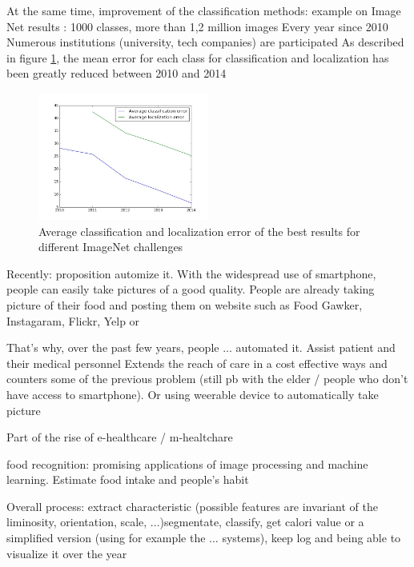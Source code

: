 At the same time, improvement of the classification methods: example on Image Net results \cite{Russakovsky2015}:
1000 classes, more than 1,2 million images
Every year since 2010
Numerous institutions (university, tech companies) are participated
As described in figure \ref{fig:imagenet_results}, the mean error for each class for classification and localization has been greatly reduced between 2010 and 2014

\begin{figure}[h]
    \centering
    \includegraphics[width=0.5\textwidth,  height=0.455\textwidth ]{img/imagenet}
    \caption{Average classification and localization error of the best results for different ImageNet challenges}
    \label{fig:imagenet_results}
\end{figure}

Recently: proposition automize it. With the widespread use of smartphone, people can easily take pictures of a good quality. People are already taking picture of their food and posting them on website such as Food Gawker, Instagaram, Flickr, Yelp or 

That's why, over the past few years, people ... automated it. Assist patient and their medical personnel
Extends the reach of care in a cost effective ways and counters some of the previous problem (still pb with the elder / people who don't have access to smartphone). Or using weerable device to automatically take picture

Part of the rise of e-healthcare / m-healtchare \cite{Hillestad2005, Menachemi2011}

food recognition: promising applications of image processing and machine learning. Estimate food intake and people's habit

Overall process:
extract characteristic (possible features are invariant of the liminosity, orientation, scale, ...)segmentate, classify, get calori value or a simplified version (using for example the ... systems), keep log and being able to visualize it over the year

